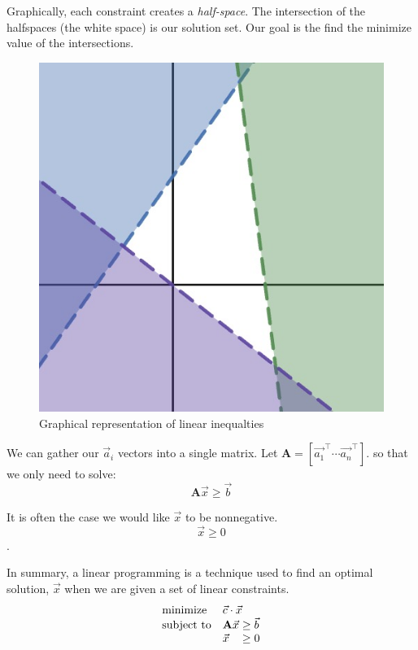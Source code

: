 \documentclass{article}
\begin{document}
Graphically, each constraint creates a \emph{half-space}. 
The intersection of the halfspaces (the white space) is our solution set. 
Our goal is the find the minimize value of the intersections.\\
\vspace{-1.3em}
\begin{figure}[ht]
  \centering
  \includegraphics[scale=.2]{assets/half_space.jpg}  
  \caption{Graphical representation of linear inequalties}
\end{figure}

We can gather our \( \vec{a}_i \) vectors into a single matrix. 
Let $\mathbf{A} = [\vec{a_1}^\top \cdots \vec{a_n}^\top]$.
so that we only need to solve:
\[
\mathbf{A} \vec{x} \geq \vec{b}
\]

It is often the case we would like \( \vec{x} \) to be nonnegative.
\[ \vec{x} \geq 0 \]. 

In summary, a linear programming is a technique used to find an optimal solution, \( \vec{x} \) when we are given a set of linear constraints.
\begin{align*}
  \begin{array}{ll@{}ll}
    \text{minimize}   & \vec{c} \cdot \vec{x}& \\
    \text{subject to} & \mathbf{A} \vec{x} &\geq  \vec{b} \\
                      & \vec{x} &\geq 0 \\
    \end{array}
\end{align*}
\end{document}
